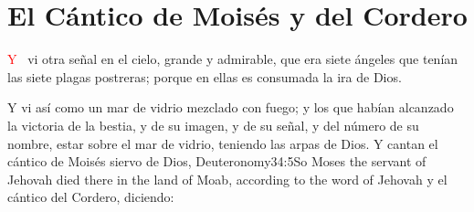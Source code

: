
\chapter{El Cántico de Moisés y del Cordero}
\lettrine[lines=3,slope=-0.5em,loversize=0.1]{\textcolor{red}{Y}}{\ } vi otra señal en el cielo, grande y admirable, que era siete ángeles que tenían las siete plagas%
 postreras; porque en ellas es consumada la ira de Dios.
\newline

\zz
{}Y vi así como un mar de vidrio mezclado con fuego; y los que habían alcanzado la victoria de la bestia, y de su imagen, y de su señal, y del número de su nombre, estar sobre el mar de vidrio, teniendo las arpas de Dios.
Y cantan el cántico de Moisés%
 siervo de Dios,%
				   {Deuteronomy}{34:5}{So Moses the servant of Jehovah died there in the land of Moab, according to the word of Jehovah}
 y el cántico del Cordero, diciendo:
